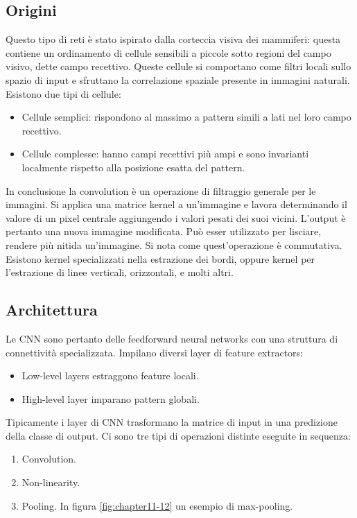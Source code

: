 	\subsection{Origini}
	Questo tipo di reti \`e stato ispirato dalla corteccia visiva dei mammiferi: questa contiene un ordinamento di cellule sensibili a piccole sotto regioni del campo visivo, dette campo recettivo.
	Queste cellule si comportano come filtri locali sullo spazio di input e sfruttano la correlazione spaziale presente in immagini naturali.
	Esistono due tipi di cellule:
	\begin{multicols}{2}
		\begin{itemize}
			\item Cellule semplici: rispondono al massimo a pattern simili a lati nel loro campo recettivo.
			\item Cellule complesse: hanno campi recettivi pi\`u ampi e sono invarianti localmente rispetto alla posizione esatta del pattern.
		\end{itemize}
	\end{multicols}
	In conclusione la convolution \`e un operazione di filtraggio generale per le immagini.
	Si applica una matrice kernel a un'immagine e lavora determinando il valore di un pixel centrale aggiungendo i valori pesati dei suoi vicini.
	L'output \`e pertanto una nuova immagine modificata.
	Pu\`o esser utilizzato per lisciare, rendere pi\`u nitida un'immagine.
	Si nota come quest'operazione \`e commutativa.
	Esistono kernel specializzati nella estrazione dei bordi, oppure kernel per l'estrazione di linee verticali, orizzontali, e molti altri.

	\subsection{Architettura}
	Le CNN sono pertanto delle feedforward neural networks con una struttura di connettivit\`a specializzata.
	Impilano diversi layer di feature extractors:
	\begin{multicols}{2}
		\begin{itemize}
			\item Low-level layers estraggono feature locali.
			\item High-level layer imparano pattern globali.
		\end{itemize}
	\end{multicols}
	Tipicamente i layer di CNN trasformano la matrice di input in una predizione della classe di output.
	Ci sono tre tipi di operazioni distinte eseguite in sequenza:
	\begin{multicols}{2}
		\begin{enumerate}
			\item Convolution.
			\item Non-linearity.
			\item Pooling. In figura \ref{fig:chapter11-12} un esempio di max-pooling.
		\end{enumerate}
	\end{multicols}

